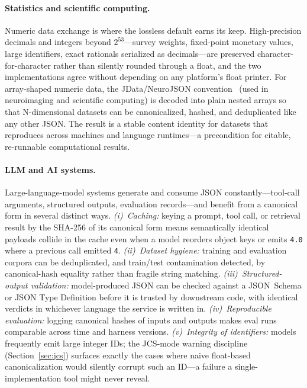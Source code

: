 \documentclass[11pt]{article}
\newcommand{\code}[1]{\texttt{#1}}
\begin{document}
\paragraph{Statistics and scientific computing.}
Numeric data exchange is where the lossless default earns its keep.
High-precision decimals and integers beyond $2^{53}$---survey weights,
fixed-point monetary values, large identifiers, exact rationals serialized as
decimals---are preserved character-for-character rather than silently rounded
through a float, and the two implementations agree without depending on any
platform's float printer. For array-shaped numeric data, the JData/NeuroJSON
convention~\cite{jdata} (used in neuroimaging and scientific computing) is decoded
into plain nested arrays so that N-dimensional datasets can be canonicalized,
hashed, and deduplicated like any other JSON. The result is a stable content
identity for datasets that reproduces across machines and language runtimes---a
precondition for citable, re-runnable computational results.

\paragraph{LLM and AI systems.}
Large-language-model systems generate and consume JSON constantly---tool-call
arguments, structured outputs, evaluation records---and benefit from a canonical
form in several distinct ways. \emph{(i)~Caching:} keying a prompt, tool call, or
retrieval result by the SHA-256 of its canonical form means semantically
identical payloads collide in the cache even when a model reorders object keys or
emits \code{4.0} where a previous call emitted \code{4}. \emph{(ii)~Dataset
hygiene:} training and evaluation corpora can be deduplicated, and train/test
contamination detected, by canonical-hash equality rather than fragile string
matching. \emph{(iii)~Structured-output validation:} model-produced JSON can be
checked against a JSON~Schema or JSON Type Definition before it is trusted by
downstream code, with identical verdicts in whichever language the service is
written in. \emph{(iv)~Reproducible evaluation:} logging canonical hashes of
inputs and outputs makes eval runs comparable across time and harness versions.
\emph{(v)~Integrity of identifiers:} models frequently emit large integer IDs;
the JCS-mode warning discipline (Section~\ref{sec:jcs}) surfaces exactly the cases
where naive float-based canonicalization would silently corrupt such an ID---a
failure a single-implementation tool might never reveal.
\end{document}
